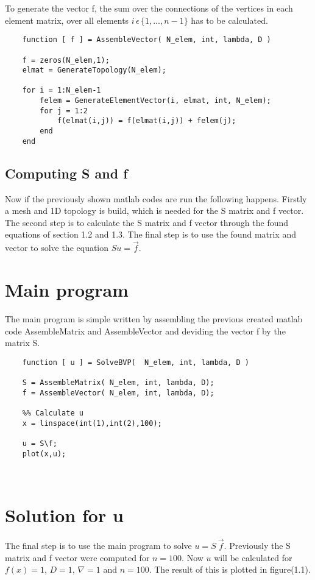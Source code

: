 \documentclass{report}
\begin{document}
\smallskip

To generate the vector f, the sum over the connections of the vertices in each element matrix, over all elements $i\,\epsilon\, \{1,...,n-1\}$  has to be calculated. 

\bigskip

	
\begin{lstlisting}
	function [ f ] = AssembleVector( N_elem, int, lambda, D )
		
	f = zeros(N_elem,1);
	elmat = GenerateTopology(N_elem);
		
	for i = 1:N_elem-1
		felem = GenerateElementVector(i, elmat, int, N_elem);
		for j = 1:2
			f(elmat(i,j)) = f(elmat(i,j)) + felem(j);
		end
	end
\end{lstlisting}	




\subsection{Computing S and f}

Now if the previously shown matlab codes are run the following happens. Firstly a mesh and 1D topology is build, which is needed for the S matrix and f vector. The second step is to calculate the S matrix and f vector through the found equations of section 1.2 and 1.3. The final step is to use the found matrix and vector to solve the equation $Su=\vec{f}$.



\section{Main program}

The main program is simple written by assembling the previous created matlab code AssembleMatrix and AssembleVector and deviding the vector f by the matrix S.
\begin{lstlisting}
	function [ u ] = SolveBVP(  N_elem, int, lambda, D )
	
	S = AssembleMatrix( N_elem, int, lambda, D);
	f = AssembleVector( N_elem, int, lambda, D);
	
	%% Calculate u
	x = linspace(int(1),int(2),100);
	
	u = S\f;
	plot(x,u); 
	
	
\end{lstlisting}


\section{Solution for u}
The final step is to use the main program to solve $u=S\ \vec{f}$. Previously the S matrix and f vector were computed for $n = 100$. Now $u$ will be calculated for $f(x)=1$, $D=1$, $\nabla = 1$ and $n = 100$. The result of this is plotted in figure(1.1). 
\end{document}

